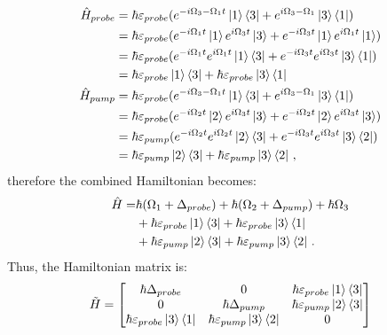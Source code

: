 \documentclass[12pt, a4paper]{article}
\begin{document}
\begin{enumerate}
    \begin{align}
      \hat{H}_{probe} &= \hbar \varepsilon_{probe}(e^{-i \Omega_3 - \Omega_1 t}\ket{1}\bra{3} + e^{i \Omega_3 - \Omega_1}\ket{3}\bra{1})\\
      &= \hbar \varepsilon_{probe}(e^{-i \Omega_1 t}\ket{1}e^{i \Omega_3 t}\ket{3} + e^{-i \Omega_3 t}\ket{1}e^{i \Omega_1 t}\ket{1})\\
      &= \hbar \varepsilon_{probe}(e^{-i \Omega_1 t}e^{i \Omega_1 t}\ket{1}\bra{3} + e^{-i \Omega_3 t}e^{i \Omega_3 t}\ket{3}\bra{1})\\
      &= \hbar \varepsilon_{probe}\ket{1}\bra{3} + \hbar \varepsilon_{probe}\ket{3}\bra{1}\\
      \hat{H}_{pump} &= \hbar \varepsilon_{probe}(e^{-i \Omega_3 - \Omega_1 t}\ket{1}\bra{3} + e^{i \Omega_3 - \Omega_1}\ket{3}\bra{1})\\
      &= \hbar \varepsilon_{probe}(e^{-i \Omega_2 t}\ket{2}e^{i \Omega_3 t}\ket{3} + e^{-i \Omega_2 t}\ket{2}e^{i \Omega_3 t}\ket{3})\\
      &= \hbar \varepsilon_{pump}(e^{-i \Omega_2 t}e^{i \Omega_2 t}\ket{2}\bra{3} + e^{-i \Omega_3 t}e^{i \Omega_3 t}\ket{3}\bra{2})\\
      &= \hbar \varepsilon_{pump}\ket{2}\bra{3} + \hbar \varepsilon_{pump}\ket{3}\bra{2}\,,\\
    \end{align}
    therefore the combined Hamiltonian becomes:
    \begin{equation}
      \begin{split}
        \hat{H} = &\hbar(\Omega_1 + \Delta_{probe}) + \hbar(\Omega_2 + \Delta_{pump}) + \hbar\Omega_3 \\ &+ \hbar \varepsilon_{probe}\ket{1}\bra{3} + \hbar \varepsilon_{probe}\ket{3}\bra{1} \\ &+ \hbar \varepsilon_{pump}\ket{2}\bra{3} + \hbar \varepsilon_{pump}\ket{3}\bra{2} \,.
      \end{split}
    \end{equation}
    Thus, the Hamiltonian matrix is:
    \begin{gather}
      \tilde{H} =
      \begin{bmatrix}
        \hbar\Delta_{probe} & 0 & \hbar\varepsilon_{probe}\ket{1}\bra{3}\\
        0 & \hbar\Delta_{pump} & \hbar \varepsilon_{pump}\ket{2}\bra{3}\\
        \hbar \varepsilon_{probe}\ket{3}\bra{1} & \hbar \varepsilon_{pump}\ket{3}\bra{2} & 0
      \end{bmatrix}

\end{gather}
\end{enumerate}
\end{document}
